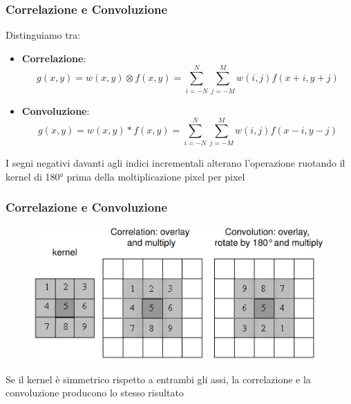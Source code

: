 \begin{frame}

	\frametitle{Correlazione e Convoluzione}

	Distinguiamo tra:
	\begin{itemize}
		\item \textbf{Correlazione}:
			$$g(x, y) = w(x, y) \otimes f(x, y) = \sum_{i=-N}^{N} \sum_{j=-M}^{M} w(i, j) f(x+i, y+j)$$
		\item \textbf{Convoluzione}:
			$$g(x, y) = w(x, y) * f(x, y) = \sum_{i=-N}^{N} \sum_{j=-M}^{M} w(i, j) f(x-i, y-j)$$
	\end{itemize}

	\begin{tcolorbox}[colback=yellow!10,colframe=blue!40!black!60]
	  I segni negativi davanti agli indici incrementali alterano l'operazione ruotando il kernel di 180° prima della moltiplicazione pixel per pixel
	\end{tcolorbox}
\end{frame}


\begin{frame}

	\frametitle{Correlazione e Convoluzione}

	\begin{figure}[!htbp]
		\centering
		\includegraphics[width=0.8\linewidth]{images/supervised/z_algorithms_deep_learning/convolution_and_correlation_2.png}
	\end{figure}

	\begin{tcolorbox}[colback=yellow!10,colframe=blue!40!black!60]
	  Se il kernel è simmetrico rispetto a entrambi gli assi, la correlazione e la convoluzione producono lo stesso risultato
	\end{tcolorbox}

\end{frame}


